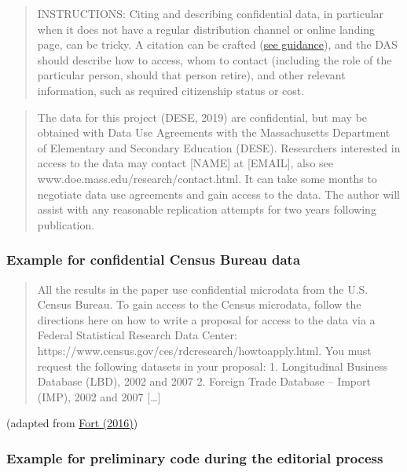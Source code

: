 \documentclass[
]{article}
\begin{document}
\begin{quote}
INSTRUCTIONS: Citing and describing confidential data, in particular
when it does not have a regular distribution channel or online landing
page, can be tricky. A citation can be crafted
(\href{https://social-science-data-editors.github.io/guidance/FAQ.html\#data-citation-without-online-link}{see
guidance}), and the DAS should describe how to access, whom to contact
(including the role of the particular person, should that person
retire), and other relevant information, such as required citizenship
status or cost.
\end{quote}

\begin{quote}
The data for this project (DESE, 2019) are confidential, but may be
obtained with Data Use Agreements with the Massachusetts Department of
Elementary and Secondary Education (DESE). Researchers interested in
access to the data may contact {[}NAME{]} at {[}EMAIL{]}, also see
www.doe.mass.edu/research/contact.html. It can take some months to
negotiate data use agreements and gain access to the data. The author
will assist with any reasonable replication attempts for two years
following publication.
\end{quote}

\hypertarget{example-for-confidential-census-bureau-data}{%
\subsubsection{Example for confidential Census Bureau
data}\label{example-for-confidential-census-bureau-data}}

\begin{quote}
All the results in the paper use confidential microdata from the U.S.
Census Bureau. To gain access to the Census microdata, follow the
directions here on how to write a proposal for access to the data via a
Federal Statistical Research Data Center:
https://www.census.gov/ces/rdcresearch/howtoapply.html. You must request
the following datasets in your proposal: 1. Longitudinal Business
Database (LBD), 2002 and 2007 2. Foreign Trade Database -- Import (IMP),
2002 and 2007 {[}\ldots{]}
\end{quote}

(adapted from \href{https://doi.org/10.1093/restud/rdw057}{Fort (2016)})

\hypertarget{example-for-preliminary-code-during-the-editorial-process}{%
\subsubsection{Example for preliminary code during the editorial
process}\label{example-for-preliminary-code-during-the-editorial-process}}
\end{document}
